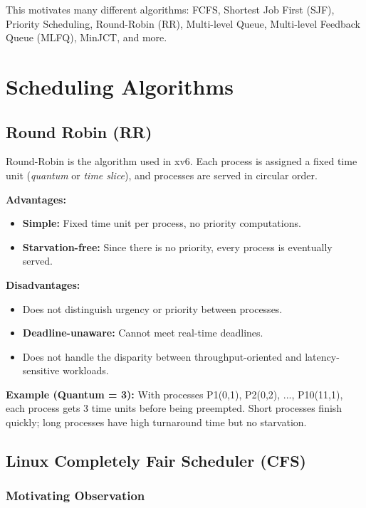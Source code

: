 \documentclass[11pt]{article}
\begin{document}
This motivates many different algorithms: FCFS, Shortest Job First (SJF), Priority Scheduling, Round-Robin (RR), Multi-level Queue, Multi-level Feedback Queue (MLFQ), MinJCT, and more.

\section{Scheduling Algorithms}

\subsection{Round Robin (RR)}

Round-Robin is the algorithm used in xv6. Each process is assigned a fixed time unit (\emph{quantum} or \emph{time slice}), and processes are served in circular order.

\textbf{Advantages:}
\begin{itemize}
    \item \textbf{Simple:} Fixed time unit per process, no priority computations.
    \item \textbf{Starvation-free:} Since there is no priority, every process is eventually served.
\end{itemize}

\textbf{Disadvantages:}
\begin{itemize}
    \item Does not distinguish urgency or priority between processes.
    \item \textbf{Deadline-unaware:} Cannot meet real-time deadlines.
    \item Does not handle the disparity between throughput-oriented and latency-sensitive workloads.
\end{itemize}

\textbf{Example (Quantum = 3):} With processes P1(0,1), P2(0,2), ..., P10(11,1), each process gets 3 time units before being preempted. Short processes finish quickly; long processes have high turnaround time but no starvation.

\subsection{Linux Completely Fair Scheduler (CFS)}

\subsubsection*{Motivating Observation}
\end{document}
